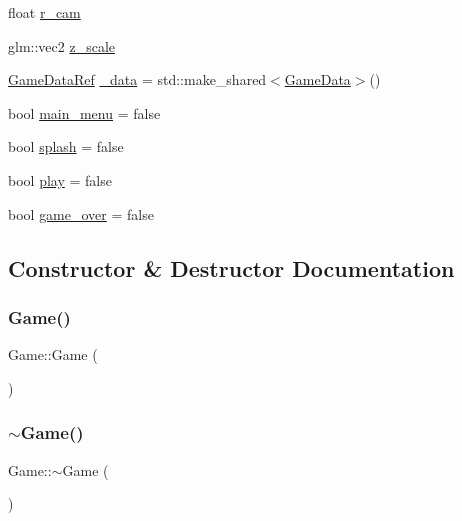 \begin{DoxyCompactItemize}
\item 
float \hyperlink{classGame_acced6cb4b6acb164ab77f5da29d20467}{r\+\_\+cam}
\item 
glm\+::vec2 \hyperlink{classGame_a84e44c43ed2393f78eb7d1db35af59aa}{z\+\_\+scale}
\item 
\hyperlink{game_8h_a513c9dd465a0df41dbb4daf40cc717c2}{Game\+Data\+Ref} \hyperlink{classGame_a8b54ceb7347e41f1e152c23bc91b618b}{\+\_\+data} = std\+::make\+\_\+shared$<$\hyperlink{structGameData}{Game\+Data}$>$()
\item 
bool \hyperlink{classGame_a03761c5c7c4b941cf1ce77e9867d9dfc}{main\+\_\+menu} = false
\item 
bool \hyperlink{classGame_a9eb1ade97d4575d24c23e480f2fa75fa}{splash} = false
\item 
bool \hyperlink{classGame_ae7f4287e9ee1d3b544679af31fb6da4f}{play} = false
\item 
bool \hyperlink{classGame_ae910a33b0b8246d3ece3d29503d98af7}{game\+\_\+over} = false
\end{DoxyCompactItemize}


\subsection{Constructor \& Destructor Documentation}
\mbox{\label{classGame_ad59df6562a58a614fda24622d3715b65}} 
\subsubsection{\texorpdfstring{Game()}{Game()}}
{\footnotesize\ttfamily Game\+::\+Game (\begin{DoxyParamCaption}{ }\end{DoxyParamCaption})}

\mbox{\label{classGame_ae3d112ca6e0e55150d2fdbc704474530}} 
\subsubsection{\texorpdfstring{$\sim$\+Game()}{~Game()}}
{\footnotesize\ttfamily Game\+::$\sim$\+Game (\begin{DoxyParamCaption}{ }\end{DoxyParamCaption})}



